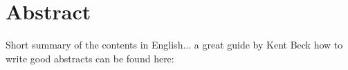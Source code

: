 \begingroup
\let\clearpage\relax
\let\cleardoublepage\relax
\let\cleardoublepage\relax

\chapter*{Abstract}
Short summary of the contents in English$\dots$ a great guide by
Kent Beck how to write good abstracts can be found here:


\vfill

\begin{otherlanguage}{french}

\end{otherlanguage}